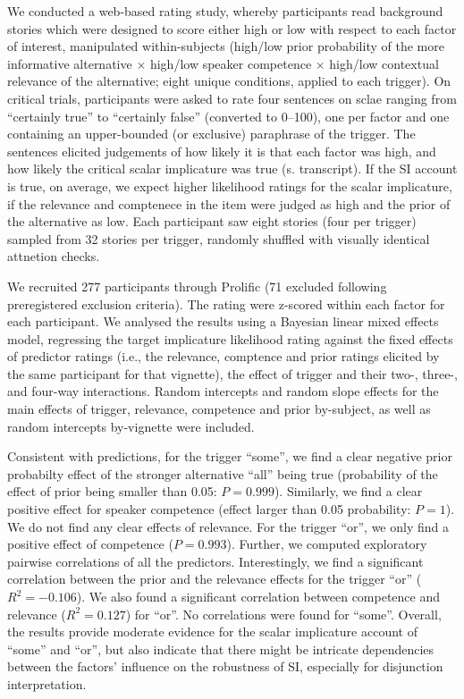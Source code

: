 \documentclass[11pt,letterpaper]{article}
\begin{document}
We conducted a web-based rating study, whereby participants read background stories which were designed to score either high or low with respect to each factor of interest, manipulated within-subjects (high/low prior probability of the more informative alternative $\times$ high/low speaker competence $\times$ high/low contextual relevance of the alternative; eight unique conditions, applied to each trigger). 
On critical trials, participants were asked to rate four sentences on sclae ranging from ``certainly true'' to ``certainly false'' (converted to 0--100), one per factor and one containing an upper-bounded (or exclusive) paraphrase of the trigger. The sentences elicited judgements of how likely it is that each factor was high, and how likely the critical scalar implicature was true (s. transcript). If the SI account is true, on average, we expect higher likelihood ratings for the scalar implicature, if the relevance and comptenece in the item were judged as high and the prior of the alternative as low. Each participant saw eight stories (four per trigger) sampled from 32 stories per trigger, randomly shuffled with visually identical attnetion checks.

We recruited 277 participants through Prolific (71  excluded following preregistered exclusion criteria). The rating were z-scored within each factor for each participant. We analysed the results using a Bayesian linear mixed effects model, regressing the target implicature likelihood rating against the fixed effects of predictor ratings (i.e., the relevance, comptence and prior ratings elicited by the same participant for that vignette), the effect of trigger and their two-, three-, and four-way interactions. Random intercepts and random slope effects for the main effects of trigger, relevance, competence and prior by-subject, as well as random intercepts by-vignette were included.

Consistent with predictions, for the trigger ``some'', we find a clear negative prior probabilty effect of the stronger alternative ``all'' being true (probability of the effect of prior being smaller than 0.05: $P = 0.999$). Similarly, we find a clear positive effect for speaker competence (effect larger than 0.05 probability: $P =  1$). We do not find any clear effects of relevance. For the trigger ``or'', we only find a positive effect of competence ($P =  0.993$). Further, we computed exploratory pairwise correlations of all the predictors. Interestingly, we find a significant correlation between the prior and the relevance effects for the trigger ``or'' ($R^2 = -0.106$). We also found a significant correlation between competence and relevance ($R^2 = 0.127$) for ``or''. No correlations were found for ``some''. 
Overall, the results provide moderate evidence for the scalar implicature account of ``some'' and ``or'', but also indicate that there might be intricate dependencies between the factors' influence on the robustness of SI, especially for disjunction interpretation.
\newpage
\end{document}
